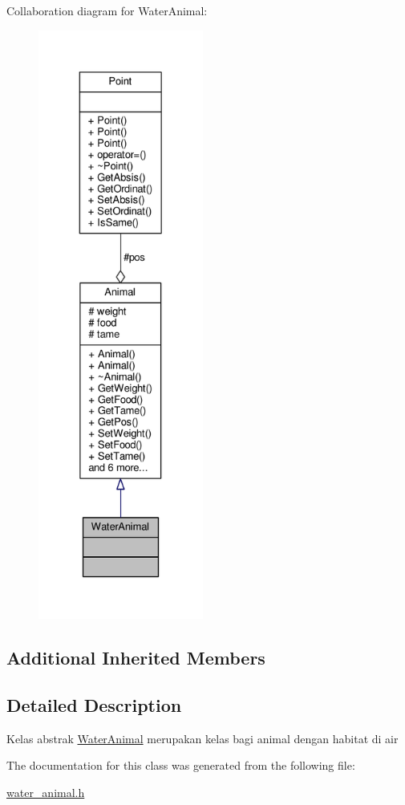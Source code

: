 Collaboration diagram for Water\+Animal\+:
\nopagebreak
\begin{figure}[H]
\begin{center}
\leavevmode
\includegraphics[height=550pt]{classWaterAnimal__coll__graph}
\end{center}
\end{figure}
\subsection*{Additional Inherited Members}


\subsection{Detailed Description}
Kelas abstrak \hyperlink{classWaterAnimal}{Water\+Animal} merupakan kelas bagi animal dengan habitat di air 

The documentation for this class was generated from the following file\+:\begin{DoxyCompactItemize}
\item 
\hyperlink{water__animal_8h}{water\+\_\+animal.\+h}\end{DoxyCompactItemize}
